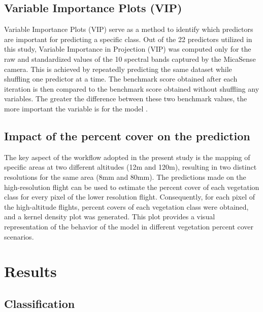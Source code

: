 \documentclass[
  number]{elsarticle}
\begin{document}
\subsection{Variable Importance Plots
(VIP)}\label{variable-importance-plots-vip}

Variable Importance Plots (VIP) serve as a method to identify which
predictors are important for predicting a specific class. Out of the 22
predictors utilized in this study, Variable Importance in Projection
(VIP) was computed only for the raw and standardized values of the 10
spectral bands captured by the MicaSense camera. This is achieved by
repeatedly predicting the same dataset while shuffling one predictor at
a time. The benchmark score obtained after each iteration is then
compared to the benchmark score obtained without shuffling any
variables. The greater the difference between these two benchmark
values, the more important the variable is for the model
\citep{WEI2015399}.

\subsection{Impact of the percent cover on the
prediction}\label{impact-of-the-percent-cover-on-the-prediction}

The key aspect of the workflow adopted in the present study is the
mapping of specific areas at two different altitudes (12m and 120m),
resulting in two distinct resolutions for the same area (8mm and 80mm).
The predictions made on the high-resolution flight can be used to
estimate the percent cover of each vegetation class for every pixel of
the lower resolution flight. Consequently, for each pixel of the
high-altitude flights, percent covers of each vegetation class were
obtained, and a kernel density plot was generated. This plot provides a
visual representation of the behavior of the model in different
vegetation percent cover scenarios.

\section{Results}\label{results}

\subsection{Classification}\label{classification}
\end{document}
